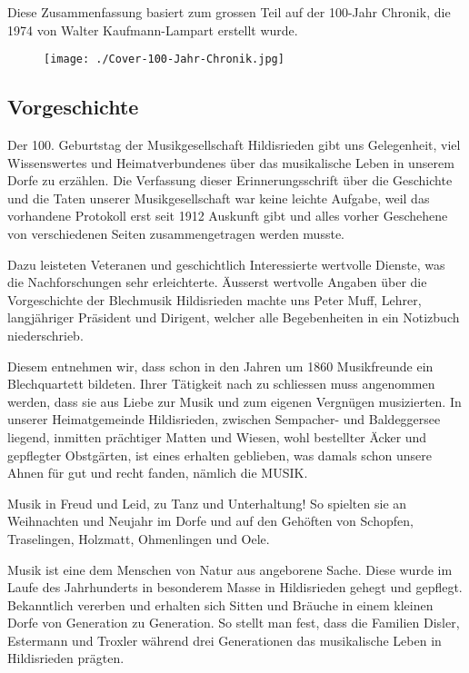 Diese Zusammenfassung basiert zum grossen Teil auf der 100-Jahr Chronik, die 1974 von Walter Kaufmann-Lampart erstellt wurde.
\begin{figure}[ht]
    \texttt{[image: ./Cover-100-Jahr-Chronik.jpg]}
\end{figure}
\subsection{Vorgeschichte}

\begin{history}

    Der 100. Geburtstag der Musikgesellschaft Hildisrieden gibt uns Gelegenheit,
    viel Wissenswertes und Heimatverbundenes über das musikalische Leben in
    unserem Dorfe zu erzählen. Die Verfassung dieser Erinnerungsschrift über die
    Geschichte und die Taten unserer Musikgesellschaft war keine leichte
    Aufgabe, weil das vorhandene Protokoll erst seit 1912 Auskunft gibt und
    alles vorher Geschehene von verschiedenen Seiten zusammengetragen werden
    musste.

    Dazu leisteten Veteranen und geschichtlich Interessierte wertvolle
    Dienste, was die Nachforschungen sehr erleichterte. Äusserst wertvolle
    Angaben über die Vorgeschichte der Blechmusik Hildisrieden machte uns Peter
    Muff, Lehrer, langjähriger Präsident und Dirigent, welcher alle
    Begebenheiten in ein Notizbuch niederschrieb.

    Diesem entnehmen wir, dass
    schon in den Jahren um 1860 Musikfreunde ein Blechquartett bildeten. Ihrer
    Tätigkeit nach zu schliessen muss angenommen werden, dass sie aus Liebe zur
    Musik und zum eigenen Vergnügen musizierten. In unserer Heimatgemeinde
    Hildisrieden, zwischen Sempacher- und Baldeggersee liegend, inmitten
    prächtiger Matten und Wiesen, wohl bestellter Äcker und gepflegter
    Obstgärten, ist eines erhalten geblieben, was damals schon unsere Ahnen für
    gut und recht fanden, nämlich die MUSIK.

    Musik in Freud und Leid, zu Tanz und Unterhaltung! So spielten sie an
    Weihnachten und Neujahr im Dorfe und auf den Gehöften von Schopfen,
    Traselingen, Holzmatt, Ohmenlingen und Oele.

    Musik ist eine dem Menschen von Natur aus angeborene Sache. Diese wurde im
    Laufe des Jahrhunderts in besonderem Masse in Hildisrieden gehegt und
    gepflegt. Bekanntlich vererben und erhalten sich Sitten und Bräuche in einem
    kleinen Dorfe von Generation zu Generation. So stellt man fest, dass die
    Familien Disler, Estermann und Troxler während drei Generationen das
    musikalische Leben in Hildisrieden prägten.

\end{history}
